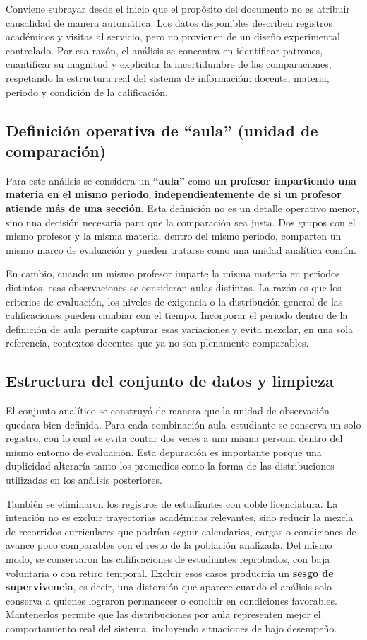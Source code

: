 \documentclass[8pt,a4paper]{article} %
\numberwithin{figure}{subsection}
\begin{document}
Conviene subrayar desde el inicio que el propósito del documento no es atribuir causalidad de manera automática. Los datos disponibles describen registros académicos y visitas al servicio, pero no provienen de un diseño experimental controlado. Por esa razón, el análisis se concentra en identificar patrones, cuantificar su magnitud y explicitar la incertidumbre de las comparaciones, respetando la estructura real del sistema de información: docente, materia, periodo y condición de la calificación.

\subsection{Definición operativa de ``aula'' (unidad de comparación)}
Para este análisis se considera un \textbf{``aula''} como \textbf{un profesor impartiendo una materia en el mismo periodo}, \textbf{independientemente de si un profesor atiende más de una sección}. Esta definición no es un detalle operativo menor, sino una decisión necesaria para que la comparación sea justa. Dos grupos con el mismo profesor y la misma materia, dentro del mismo periodo, comparten un mismo marco de evaluación y pueden tratarse como una unidad analítica común.

En cambio, cuando un mismo profesor imparte la misma materia en periodos distintos, esas observaciones se consideran aulas distintas. La razón es que los criterios de evaluación, los niveles de exigencia o la distribución general de las calificaciones pueden cambiar con el tiempo. Incorporar el periodo dentro de la definición de aula permite capturar esas variaciones y evita mezclar, en una sola referencia, contextos docentes que ya no son plenamente comparables.

\subsection{Estructura del conjunto de datos y limpieza}
El conjunto analítico se construyó de manera que la unidad de observación quedara bien definida. Para cada combinación aula--estudiante se conserva un solo registro, con lo cual se evita contar dos veces a una misma persona dentro del mismo entorno de evaluación. Esta depuración es importante porque una duplicidad alteraría tanto los promedios como la forma de las distribuciones utilizadas en los análisis posteriores.

También se eliminaron los registros de estudiantes con doble licenciatura. La intención no es excluir trayectorias académicas relevantes, sino reducir la mezcla de recorridos curriculares que podrían seguir calendarios, cargas o condiciones de avance poco comparables con el resto de la población analizada. Del mismo modo, se conservaron las calificaciones de estudiantes reprobados, con baja voluntaria o con retiro temporal. Excluir esos casos produciría un \textbf{sesgo de supervivencia}, es decir, una distorsión que aparece cuando el análisis solo conserva a quienes lograron permanecer o concluir en condiciones favorables. Mantenerlos permite que las distribuciones por aula representen mejor el comportamiento real del sistema, incluyendo situaciones de bajo desempeño.
\end{document}
